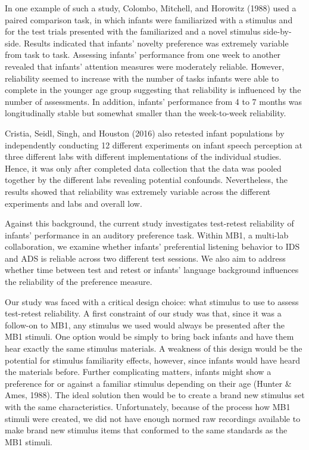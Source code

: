 \documentclass[
  man,floatsintext]{apa6}
\begin{document}
In one example of such a study, Colombo, Mitchell, and Horowitz (1988) used a paired comparison task, in which infants were familiarized with a stimulus and for the test trials presented with the familiarized and a novel stimulus side-by-side. Results indicated that infants' novelty preference was extremely variable from task to task. Assessing infants' performance from one week to another revealed that infants' attention measures were moderately reliable. However, reliability seemed to increase with the number of tasks infants were able to complete in the younger age group suggesting that reliability is influenced by the number of assessments. In addition, infants' performance from 4 to 7 months was longitudinally stable but somewhat smaller than the week-to-week reliability.

Cristia, Seidl, Singh, and Houston (2016) also retested infant populations by independently conducting 12 different experiments on infant speech perception at three different labs with different implementations of the individual studies. Hence, it was only after completed data collection that the data was pooled together by the different labs revealing potential confounds. Nevertheless, the results showed that reliability was extremely variable across the different experiments and labs and overall low.

Against this background, the current study investigates test-retest reliability of infants' performance in an auditory preference task. Within MB1, a multi-lab collaboration, we examine whether infants' preferential listening behavior to IDS and ADS is reliable across two different test sessions. We also aim to address whether time between test and retest or infants' language background influences the reliability of the preference measure.

Our study was faced with a critical design choice: what stimulus to use to assess test-retest reliability. A first constraint of our study was that, since it was a follow-on to MB1, any stimulus we used would always be presented after the MB1 stimuli. One option would be simply to bring back infants and have them hear exactly the same stimulus materials. A weakness of this design would be the potential for stimulus familiarity effects, however, since infants would have heard the materials before. Further complicating matters, infants might show a preference for or against a familiar stimulus depending on their age (Hunter \& Ames, 1988). The ideal solution then would be to create a brand new stimulus set with the same characteristics. Unfortunately, because of the process how MB1 stimuli were created, we did not have enough normed raw recordings available to make brand new stimulus items that conformed to the same standards as the MB1 stimuli.
\end{document}
